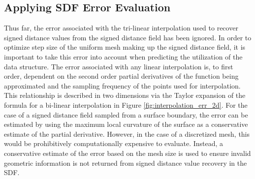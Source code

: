 
\subsection{Applying SDF Error Evaluation}

Thus far, the error associated with the tri-linear interpolation used to recover
signed distance values from the signed distance field has been ignored. In order
to optimize step size of the uniform mesh making up the signed distance field,
it is important to take this error into account when predicting the utilization
of the data structure. The error associated with any linear interpolation is, to
first order, dependent on the second order partial derivatives of the function
being approximated and the sampling frequency of the points used for
interpolation. This relationship is described in two dimensions via the Taylor
expansion of the formula for a bi-linear interpolation in Figure
\ref{fig:interpolation_err_2d}. For the case of a signed distance field sampled
from a surface boundary, the error can be estimated by using the maximum local
curvature of the surface as a conservative estimate of the partial
derivative. However, in the case of a discretized mesh, this would be
prohibitively computationally expensive to evaluate. Instead, a conservative
estimate of the error based on the mesh size is used to ensure invalid geometric
information is not returned from signed distance value recovery in the SDF.

